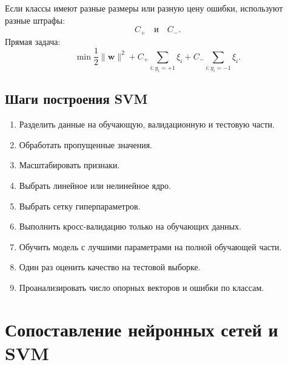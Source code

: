 \documentclass[12pt,a4paper]{article}
\theoremstyle{definition}
\newcommand{\1}{\mathbf{1}}
\begin{document}
Если классы имеют разные размеры или разную цену ошибки, используют
разные штрафы:
\[
    C_+
    \quad\text{и}\quad
    C_-.
\]
Прямая задача:
\[
    \min
    \frac{1}{2}\|\bm{w}\|^2
    +
    C_+\sum_{i:y_i=+1}\xi_i
    +
    C_-\sum_{i:y_i=-1}\xi_i.
\]

\subsection{Шаги построения SVM}

\begin{enumerate}
    \item Разделить данные на обучающую, валидационную и тестовую
    части.
    \item Обработать пропущенные значения.
    \item Масштабировать признаки.
    \item Выбрать линейное или нелинейное ядро.
    \item Выбрать сетку гиперпараметров.
    \item Выполнить кросс-валидацию только на обучающих данных.
    \item Обучить модель с лучшими параметрами на полной обучающей
    части.
    \item Один раз оценить качество на тестовой выборке.
    \item Проанализировать число опорных векторов и ошибки по классам.
\end{enumerate}

\section{Сопоставление нейронных сетей и SVM}
\end{document}
